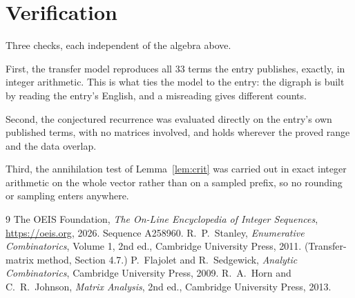 \documentclass[11pt,a4paper]{article}
\theoremstyle{plain}
\theoremstyle{definition}
\begin{document}
\section{Verification}

Three checks, each independent of the algebra above.

First, the transfer model reproduces all $33$ terms the entry publishes, exactly, in
integer arithmetic. This is what ties the model to the entry: the digraph is built by reading
the entry's English, and a misreading gives different counts.

Second, the conjectured recurrence was evaluated directly on the entry's own published terms,
with no matrices involved, and holds wherever the proved range and the data overlap.

Third, the annihilation test of Lemma~\ref{lem:crit} was carried out in exact integer
arithmetic on the whole vector rather than on a sampled prefix, so no rounding or sampling
enters anywhere.

\begin{thebibliography}{9}
 The OEIS Foundation, \emph{The On-Line Encyclopedia of Integer
Sequences}, \url{https://oeis.org}, 2026. Sequence A258960.
 R.~P.~Stanley, \emph{Enumerative Combinatorics}, Volume 1, 2nd ed.,
Cambridge University Press, 2011. (Transfer-matrix method, Section 4.7.)
 P.~Flajolet and R.~Sedgewick, \emph{Analytic Combinatorics}, Cambridge
University Press, 2009.
 R.~A.~Horn and C.~R.~Johnson, \emph{Matrix Analysis}, 2nd ed., Cambridge
University Press, 2013.
\end{thebibliography}
\end{document}
